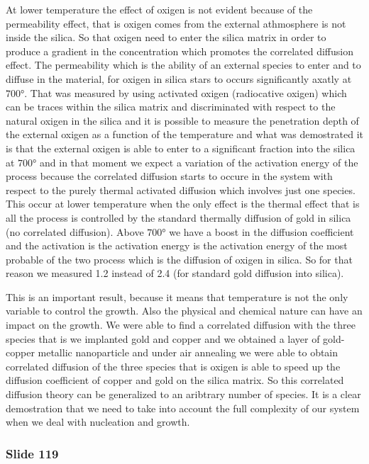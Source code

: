 \documentclass[../main/main.tex]{subfiles}
\begin{document}
At lower temperature the effect of oxigen is not evident because of the permeability effect, that is oxigen comes from the external athmosphere is not inside the silica. So that oxigen need to enter the silica matrix in order to produce a gradient in the concentration which promotes the correlated diffusion effect. The permeability which is the ability of an external species to enter and to diffuse in the material, for oxigen in silica stars to occurs significantly axatly at \( 700° \). That was measured by using activated oxigen (radiocative oxigen) which can be traces within the silica matrix and discriminated with respect to the natural oxigen in the silica and it is possible to measure the penetration depth of the external oxigen as a function of the temperature and what was demostrated it is that the external oxigen is able to enter to a significant fraction into the silica at \( 700° \) and in that moment we expect a variation of the activation energy of the process because the correlated diffusion starts to occure in the system with respect to the purely thermal activated diffusion which involves just one species. This occur at lower temperature when the only effect is the thermal effect that is all the process is controlled by the standard thermally diffusion of gold in silica (no correlated diffusion). Above \( 700° \) we have a boost in the diffusion coefficient and the activation is the activation energy is the activation energy of the most probable of the two process which is the diffusion of oxigen in silica. So for that reason we measured 1.2 instead of 2.4 (for standard gold diffusion into silica).

This is an important result, because it means that temperature is not the only variable to control the growth. Also the physical and chemical nature can have an impact on the growth.
We were able to find a correlated diffusion with the three species  that is we implanted gold and copper and we obtained a layer of gold-copper metallic nanoparticle and under air annealing we were able to obtain correlated diffusion of the three species that is oxigen is able to speed up the diffusion coefficient of copper and gold on the silica matrix. So this correlated diffusion theory can be generalized to an aribtrary number of species. It is a clear demostration that we need to take into account the full complexity of our system when we deal with nucleation and growth.

\newpage

\subsubsection{Slide 119}
\end{document}
